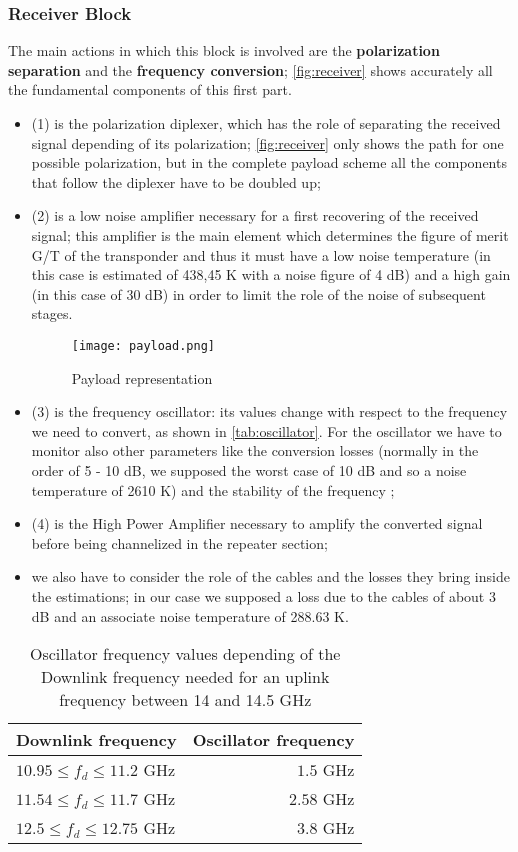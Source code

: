 \subsubsection{Receiver Block}
The main actions in which this block is involved are the \textbf{polarization separation} and the \textbf{frequency conversion}; \autoref{fig:receiver} shows accurately all the fundamental components of this first part.
\begin{itemize}
\item (1) is the polarization diplexer, which has the role of separating the received signal depending of its polarization; \autoref{fig:receiver} only shows the path for one possible polarization, but in the complete payload scheme all the components that follow the diplexer have to be doubled up;
\item (2) is a low noise amplifier necessary for a first recovering of the received signal; this amplifier is the main element which determines the figure of merit G/T of the transponder and thus it must have a low noise temperature (in this case is estimated of 438,45 K with a noise figure of 4 dB) and a high gain (in this case of 30 dB) in order to limit the role of the noise of subsequent stages.
\begin{sidewaysfigure}
\centering
\texttt{[image: payload.png]}
\caption{Payload representation}
\label{fig:payload}
\end{sidewaysfigure}
\item (3) is the frequency oscillator: its values change with respect to the frequency we need to convert, as shown in \autoref{tab:oscillator}. For the oscillator we have to monitor also other parameters like the conversion losses (normally in the order of 5 - 10 dB, we supposed the worst case of 10 dB and so a noise temperature of 2610 K) and the stability of the frequency \cite{Maral2017};
\item (4) is the High Power Amplifier necessary to amplify the converted signal before being channelized in the repeater section;
\item we also have to consider the role of the cables and the losses they bring inside the estimations; in our case we supposed a loss due to the cables of about 3 dB and an associate noise temperature of 288.63 K.
\end{itemize}
	\begin{table}
	\centering
	\begin{tabular}{lr}
	\toprule
	Downlink frequency & Oscillator frequency\\
	\midrule
	$10.95 \leq f_d \leq 11.2$ GHz & $1.5$ GHz\\
	$11.54 \leq f_d \leq 11.7$ GHz & $2.58$ GHz\\
	$12.5 \leq f_d \leq 12.75$ GHz & $3.8$ GHz\\
	\bottomrule
	\end{tabular}
	\caption{Oscillator frequency values depending of the Downlink frequency needed for an uplink frequency between 14 and 14.5 GHz}
	\label{tab:oscillator}
\end{table}
